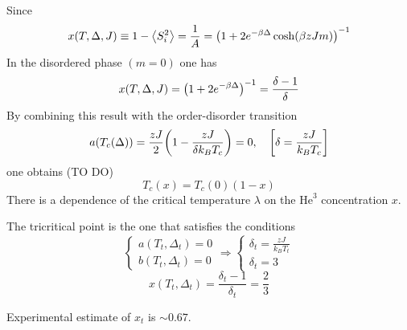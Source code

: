 \documentclass[../main/main.tex]{subfiles}
\begin{document}
Since
\begin{equation}
  x (T, \Delta , J) \equiv  1 - \expval{S_i^2} = \frac{1}{A} = \qty(1 + 2 e^{-\beta \Delta }  \cosh (\beta z J m))^{-1}
\end{equation}
In the disordered phase \( (m=0) \) one has
\begin{equation}
  x (T,\Delta , J) = \qty(1 + 2 e^{-\beta \Delta } )^{-1} = \frac{\delta -1}{\delta }
\end{equation}
By combining this result with the order-disorder transition
\begin{equation}
  a (T_c (\Delta )) = \frac{z J}{2} \qty(1 - \frac{z J}{\delta k_B T_c}) = 0, \quad \qty[\delta = \frac{z J}{k_B T_c}]
\end{equation}
one obtains (TO DO)
\begin{equation}
  T_c (x) = T_c (0) (1-x)
\end{equation}
There is a dependence of the critical temperature \( \lambda  \) on the \( \text{He}^3 \) concentration \( x \).

The tricritical point is the one that satisfies the conditions
  \begin{equation}
    \begin{cases}
     a (T_t, \Delta _t) = 0 \\
     b (T_t, \Delta _t) = 0
    \end{cases} \Rightarrow
    \begin{cases}
      \delta _t = \frac{zJ}{k_B T_t} \\
      \delta _t = 3
    \end{cases}
\end{equation}
\begin{equation}
  x (T_t, \Delta _t) = \frac{\delta _t - 1}{\delta _t} = \frac{2}{3}
\end{equation}
\begin{remark}
Experimental estimate of \( x_t \) is \( \sim 0.67 \).
\end{remark}
\end{document}
